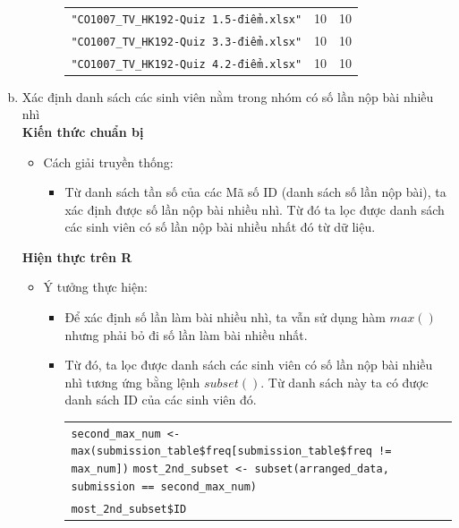 \documentclass[a4paper]{article}
\theoremstyle{definition}
\begin{document}
\begin{enumerate}[a)]
\begin{itemize}
\begin{itemize}
\begin{center}
\begin{tabular}{l c c}
                     \texttt{"CO1007\_TV\_HK192-Quiz 1.5-điểm.xlsx"} & 10 & 10\\ 
                     \texttt{"CO1007\_TV\_HK192-Quiz 3.3-điểm.xlsx"} & 10 & 10\\ 
                     \texttt{"CO1007\_TV\_HK192-Quiz 4.2-điểm.xlsx"} & 10 & 10\\ 
                \end{tabular}
            \end{center}
        \end{itemize}
    \end{itemize}
    \bf\item {Xác định danh sách các sinh viên nằm trong nhóm có số lần nộp bài nhiều nhì}\\[6pt]
    \bf Kiến thức chuẩn bị\normalfont
    \begin{itemize}
        \item Cách giải truyền thống:
        \begin{itemize}
            \item Từ danh sách tần số của các Mã số ID (danh sách số lần nộp bài), ta xác định được số lần nộp bài nhiều nhì. Từ đó ta lọc được danh sách các sinh viên có số lần nộp bài nhiều nhất đó từ dữ liệu.
        \end{itemize}
    \end{itemize}
    \bf Hiện thực trên R\normalfont
    \begin{itemize}
        \item Ý tưởng thực hiện:
        \begin{itemize}
            \item Để xác định số lần làm bài nhiều nhì, ta vẫn sử dụng hàm $max()$ nhưng phải bỏ đi số lần làm bài nhiều nhất.
            \item Từ đó, ta lọc được danh sách các sinh viên có số lần nộp bài nhiều nhì tương ứng bằng lệnh $subset()$. Từ danh sách này ta có được danh sách ID của các sinh viên đó.
            \begin{center}
                \begin{tabular}{p{13cm}}
                    \texttt{second\_max\_num <- max(submission\_table\$freq[submission\_table\$freq != max\_num])}
                    \texttt{most\_2nd\_subset <- subset(arranged\_data, submission == second\_max\_num)}\\
                    \texttt{most\_2nd\_subset\$ID}
                \end{tabular}
            \end{center}

\end{itemize}
\end{itemize}
\end{enumerate}
\end{document}
